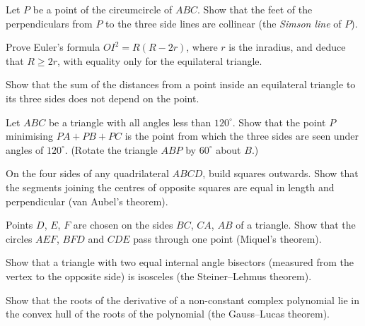 \begin{exercise}[$\star\star$]\label{geometry:ex:simson}
Let $P$ be a point of the circumcircle of $ABC$. Show that the feet of the perpendiculars from $P$ to the three side lines are collinear
(the \emph{Simson line} of $P$).
\end{exercise}

\begin{exercise}[$\star\star$]\label{geometry:ex:eulerOI}
Prove Euler's formula $OI^2=R(R-2r)$, where $r$ is the inradius, and deduce that $R\ge2r$, with equality only for the equilateral triangle.
\end{exercise}

\begin{exercise}[$\star$]\label{geometry:ex:viviani}
Show that the sum of the distances from a point inside an equilateral triangle to its three sides does not depend on the point.
\end{exercise}

\begin{exercise}[$\star\star$]\label{geometry:ex:fermatpoint}
Let $ABC$ be a triangle with all angles less than $120^\circ$. Show that the point $P$ minimising $PA+PB+PC$ is the point from which the
three sides are seen under angles of $120^\circ$. (Rotate the triangle $ABP$ by $60^\circ$ about $B$.)
\end{exercise}

\begin{exercise}[$\star\star$]\label{geometry:ex:vanaubel}
On the four sides of any quadrilateral $ABCD$, build squares outwards. Show that the segments joining the centres of opposite squares
are equal in length and perpendicular (van Aubel's theorem).
\end{exercise}

\begin{exercise}[$\star\star$]\label{geometry:ex:miquel}
Points $D$, $E$, $F$ are chosen on the sides $BC$, $CA$, $AB$ of a triangle. Show that the circles $AEF$, $BFD$ and $CDE$ pass through
one point (Miquel's theorem).
\end{exercise}

\begin{exercise}[$\star\star\star$]\label{geometry:ex:steinerlehmus}
Show that a triangle with two equal internal angle bisectors (measured from the vertex to the opposite side) is isosceles (the
Steiner--Lehmus theorem).
\end{exercise}

\begin{exercise}[$\star\star$]\label{geometry:ex:gausslucas}
Show that the roots of the derivative of a non-constant complex polynomial lie in the convex hull of the roots of the polynomial (the
Gauss--Lucas theorem).
\end{exercise}


